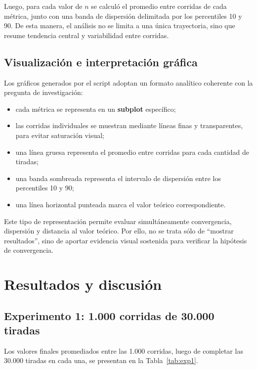 \documentclass{article}
\begin{document}
Luego, para cada valor de $n$ se calculó el promedio entre corridas de cada métrica, junto con una banda de dispersión delimitada por los percentiles 10 y 90. De esta manera, el análisis no se limita a una única trayectoria, sino que resume tendencia central y variabilidad entre corridas.

\subsection{Visualización e interpretación gráfica}
Los gráficos generados por el script adoptan un formato analítico coherente con la pregunta de investigación:

\begin{itemize}
    \item cada métrica se representa en un \textbf{subplot} específico;
    \item las corridas individuales se muestran mediante líneas finas y transparentes, para evitar saturación visual;
    \item una línea gruesa representa el promedio entre corridas para cada cantidad de tiradas;
    \item una banda sombreada representa el intervalo de dispersión entre los percentiles 10 y 90;
    \item una línea horizontal punteada marca el valor teórico correspondiente.
\end{itemize}

Este tipo de representación permite evaluar simultáneamente convergencia, dispersión y distancia al valor teórico. Por ello, no se trata sólo de “mostrar resultados”, sino de aportar evidencia visual sostenida para verificar la hipótesis de convergencia.

\section{Resultados y discusión}

\subsection{Experimento 1: 1.000 corridas de 30.000 tiradas}
Los valores finales promediados entre las 1.000 corridas, luego de completar las 30.000 tiradas en cada una, se presentan en la Tabla~\ref{tab:exp1}.
\end{document}

